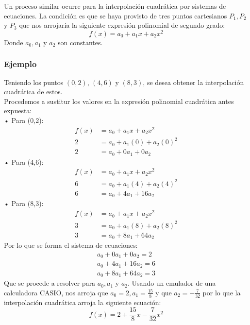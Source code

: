 \documentclass[letterpaper, 12pt]{article}
\begin{document}
\newpage
\justify
Un proceso similar ocurre para la interpolación cuadrática por sistemas de ecuaciones. La condición es que se haya provisto
de tres puntos cartesianos \(P_1,P_2\) y \(P_3\) que nos arrojaría la siguiente expresión polinomial de segundo grado:
{\large\[f(x)=a_0+a_1x+a_2x^2\]}
\justify
Donde \(a_0,a_1\) y \(a_2\) son constantes.
\subsubsection*{Ejemplo}
\justify
Teniendo los puntos \((0,2)\), \((4,6)\) y \((8,3)\), se desea obtener la interpolación cuadrática de estos.
\\\newline
Procedemos a sustitur los valores en la expresión polinomial cuadrática antes expuesta:
\\\newline
• Para (0,2):
{\large\begin{equation*}
    \begin{aligned}
        f(x)&=a_0+a_1x+a_2x^2\\
        2&=a_0+a_1(0)+a_2(0)^2\\
        2&=a_0+0a_1+0a_2
    \end{aligned}
\end{equation*}}
• Para (4,6):
{\large\begin{equation*}
    \begin{aligned}
        f(x)&=a_0+a_1x+a_2x^2\\
        6&=a_0+a_1(4)+a_2(4)^2\\
        6&=a_0+4a_1+16a_2
    \end{aligned}
\end{equation*}}
• Para (8,3):
{\large\begin{equation*}
    \begin{aligned}
        f(x)&=a_0+a_1x+a_2x^2\\
        3&=a_0+a_1(8)+a_2(8)^2\\
        3&=a_0+8a_1+64a_2
    \end{aligned}
\end{equation*}}
Por lo que se forma el sistema de ecuaciones:
{\large\begin{equation*}
    \begin{aligned}
        a_0+0a_1+0a_2=2\\
        a_0+4a_1+16a_2=6\\
        a_0+8a_1+64a_2=3
    \end{aligned}
\end{equation*}}
\justify
Que se procede a resolver para \(a_0,a_1\) y \(a_2\). Usando un emulador de una calculadora CASIO, nos arroja que
\(a_0=2,a_1=\frac{15}{8}\) y que \(a_2=-\frac{7}{32}\) por lo que la interpolación cuadrática arroja la siguiente ecuación:
{\large \[f(x)=2+\frac{15}{8}x-\frac{7}{32}x^2\]}
\end{document}
